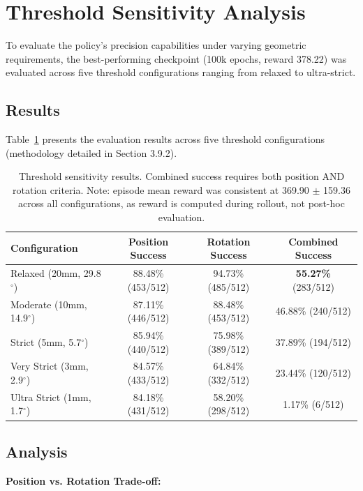 \documentclass[12pt,a4paper,oneside]{report}
\begin{document}
\section{Threshold Sensitivity Analysis}

To evaluate the policy's precision capabilities under varying geometric requirements, the best-performing checkpoint (100k epochs, reward 378.22) was evaluated across five threshold configurations ranging from relaxed to ultra-strict.

\subsection{Results}

Table~\ref{tab:threshold_sensitivity} presents the evaluation results across five threshold configurations (methodology detailed in Section 3.9.2).

\begin{table}[h]
\centering
\small
\begin{tabular}{|l|c|c|c|}
\hline
\textbf{Configuration} & \textbf{Position Success} & \textbf{Rotation Success} & \textbf{Combined Success} \\
\hline
Relaxed (20mm, 29.8$^\circ$) & 88.48\% (453/512) & 94.73\% (485/512) & \textbf{55.27\%} (283/512) \\
Moderate (10mm, 14.9$^\circ$) & 87.11\% (446/512) & 88.48\% (453/512) & 46.88\% (240/512) \\
Strict (5mm, 5.7$^\circ$) & 85.94\% (440/512) & 75.98\% (389/512) & 37.89\% (194/512) \\
Very Strict (3mm, 2.9$^\circ$) & 84.57\% (433/512) & 64.84\% (332/512) & 23.44\% (120/512) \\
Ultra Strict (1mm, 1.7$^\circ$) & 84.18\% (431/512) & 58.20\% (298/512) & 1.17\% (6/512) \\
\hline
\end{tabular}
\caption{Threshold sensitivity results. Combined success requires both position AND rotation criteria. Note: episode mean reward was consistent at 369.90 $\pm$ 159.36 across all configurations, as reward is computed during rollout, not post-hoc evaluation.}
\label{tab:threshold_sensitivity}
\end{table}

\subsection{Analysis}

\textbf{Position vs. Rotation Trade-off:}
\end{document}
